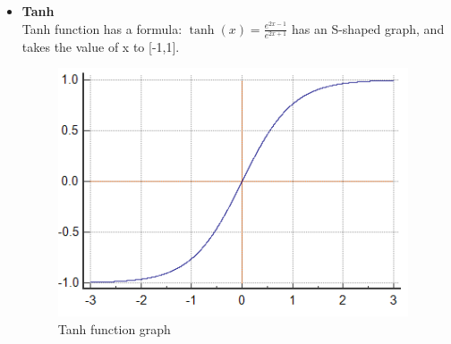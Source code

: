 \begin{itemize}
	\item \textbf{Tanh}\\
	Tanh function has a formula:  $\tanh(x) = \frac{e^{2x-1}}{e^{2x+1}}$ has an S-shaped graph, and takes the value of x to [-1,1].
	\begin{center}
		\begin{figure}[H]
			\centering
			\includegraphics[width=0.5\columnwidth]{images/chap2/tanh.png}
			\caption{Tanh function graph}
			\label{chap2:tanh}
		\end{figure}
	\end{center}


\end{itemize}
